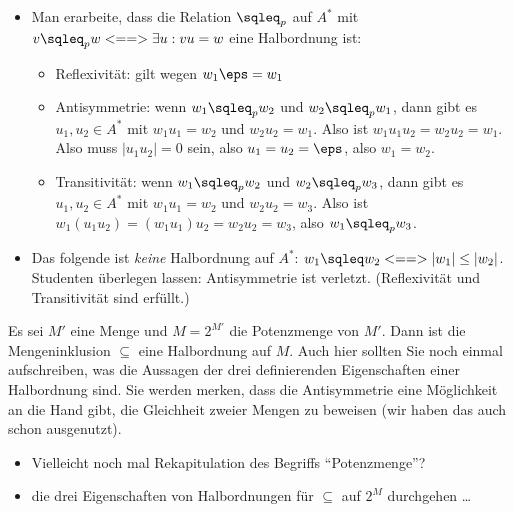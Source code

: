 \begin{tutorium}
  \begin{itemize}
  \item Man erarbeite, dass die Relation $\sqleq_p$ auf $A^*$ mit
    $v\sqleq_p w <==> \exists u: vu=w$ eine Halbordnung ist:
    \begin{itemize}
    \item Reflexivität: gilt wegen  $w_1\eps=w_1$
    \item Antisymmetrie: wenn $w_1\sqleq_p w_2$ und $w_2\sqleq_p w_1$,
      dann gibt es $u_1,u_2\in A^*$ mit $w_1u_1=w_2$ und
      $w_2u_2=w_1$. Also ist $w_1u_1u_2=w_2u_2=w_1$. Also muss
      $|u_1u_2|=0$ sein, also $u_1=u_2=\eps$, also $w_1=w_2$.
    \item Transitivität: wenn $w_1\sqleq_p w_2$ und $w_2\sqleq_p w_3$,
      dann gibt es $u_1,u_2\in A^*$ mit $w_1u_1=w_2$ und
      $w_2u_2=w_3$.  Also ist $w_1(u_1u_2)=(w_1u_1)u_2=w_2u_2=w_3$,
      also $w_1\sqleq_p w_3$.
    \end{itemize}
  \item Das folgende ist \emph{keine} Halbordnung auf $A^*$:
    $w_1\sqleq w_2 <==> |w_1| \leq |w_2|$. Studenten überlegen
    lassen: Antisymmetrie ist verletzt. (Reflexivität und
    Transitivität sind erfüllt.)
  \end{itemize}
\end{tutorium}

Es sei $M'$ eine Menge und $M=2^{M'}$ die Potenzmenge von $M'$. Dann
ist die Mengeninklusion $\subseteq$ eine Halbordnung auf $M$. Auch
hier sollten Sie noch einmal aufschreiben, was die Aussagen der drei
definierenden Eigenschaften einer Halbordnung sind. Sie werden merken,
dass die Antisymmetrie eine Möglichkeit an die Hand gibt, die
Gleichheit zweier Mengen zu beweisen (wir haben das auch schon
ausgenutzt).

\begin{tutorium}
  \begin{itemize}
  \item Vielleicht noch mal Rekapitulation des Begriffs
    "`Potenzmenge"'?
  \item die drei Eigenschaften von Halbordnungen für $\subseteq$ auf
    $2^M$ durchgehen \dots
  \end{itemize}
\end{tutorium}

